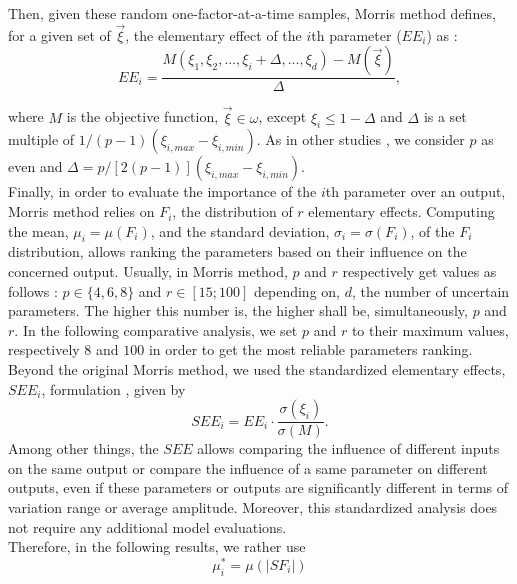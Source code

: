 Then, given these random one-factor-at-a-time samples, Morris method defines, for a given set of $\vec{\xi}$, the elementary effect of the $i$th parameter ($EE_i$) as :
\begin{equation}
  EE_{i}=\frac{M(\xi_1,\xi_2,...,\xi_i+\Delta,...,\xi_d)-M(\vec{\xi})}{\Delta},
\end{equation}

\noindent where $M$ is the objective function, $\vec{\xi}\in\omega$, except $\xi_i\leq1-\Delta$ and $\Delta$ is a set multiple of $1/(p-1)\left(\xi_{i,max}-\xi_{i,min}\right)$. As in other studies \cite{Sin2009,Moret2017,Moret2017PhDThesis}, we consider $p$ as even and $\Delta=p/[2(p-1)]\left(\xi_{i,max}-\xi_{i,min}\right)$.\\

Finally, in order to evaluate the importance of the $i$th parameter over an output, Morris method relies on $F_i$, the distribution of $r$ elementary effects. Computing the mean, $\mu_{i}=\mu(F_{i})$, and the standard deviation, $\sigma_{i}=\sigma(F_{i})$, of the $F_{i}$ distribution, allows ranking the parameters based on their influence on the concerned output. Usually, in Morris method, $p$ and $r$ respectively get values as follows : $p\in \{4,6,8\}$ and $r\in [15;100]$ depending on, $d$, the number of uncertain parameters. The higher this number is,  the higher shall be, simultaneously, $p$ and $r$. In the following comparative analysis, we set $p$ and $r$ to their maximum values, respectively $8$ and $100$ in order to get the most reliable parameters ranking.\\

Beyond the original Morris method, we used the standardized elementary effects, $SEE_{i}$, formulation \cite{Sin2009}, given by
\begin{equation}
    SEE_{i}=EE_{i}\cdot\frac{\sigma(\xi_i)}{\sigma(M)}.
\end{equation}
Among other things, the $SEE$ allows comparing the influence of different inputs on the same output or compare the influence of a same parameter on different outputs, even if these parameters or outputs are significantly different in terms of variation range or average amplitude. Moreover, this standardized analysis does not require any additional model evaluations.\\
Therefore, in the following results, we rather use
\begin{equation}
\mu^*_{i}=\mu(\vert SF_{i}\vert)
\label{eq:mu*}
\end{equation}

